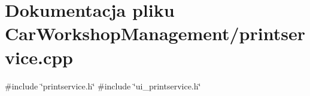 \section{Dokumentacja pliku Car\+Workshop\+Management/printservice.cpp}
\label{printservice_8cpp}
{\ttfamily \#include \char`\"{}printservice.\+h\char`\"{}}\newline
{\ttfamily \#include \char`\"{}ui\+\_\+printservice.\+h\char`\"{}}\newline
